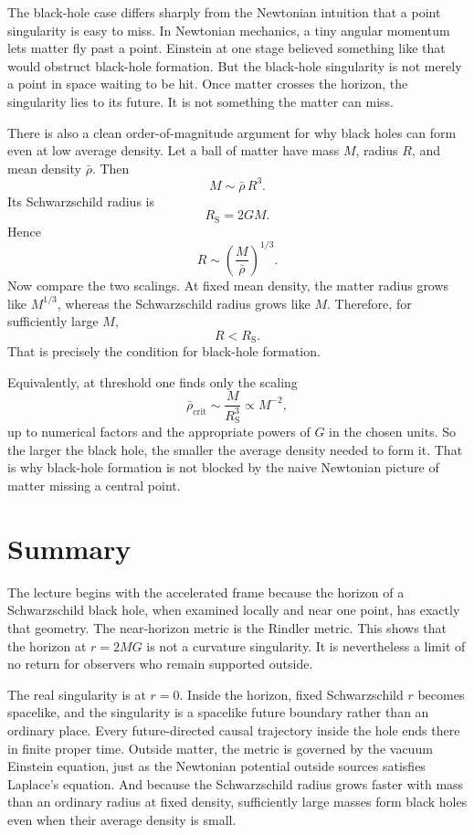 The black-hole case differs sharply from the Newtonian intuition that a point singularity is easy to miss. In Newtonian mechanics, a tiny angular momentum lets matter fly past a point. Einstein at one stage believed something like that would obstruct black-hole formation. But the black-hole singularity is not merely a point in space waiting to be hit. Once matter crosses the horizon, the singularity lies to its future. It is not something the matter can miss.

There is also a clean order-of-magnitude argument for why black holes can form even at low average density. Let a ball of matter have mass \(M\), radius \(R\), and mean density \(\bar\rho\). Then
\begin{equation}
M \sim \bar\rho\,R^3.
\end{equation}
Its Schwarzschild radius is
\begin{equation}
R_{\mathrm S} = 2GM.
\end{equation}
Hence
\begin{equation}
R \sim \left(\frac{M}{\bar\rho}\right)^{1/3}.
\end{equation}
Now compare the two scalings. At fixed mean density, the matter radius grows like \(M^{1/3}\), whereas the Schwarzschild radius grows like \(M\). Therefore, for sufficiently large \(M\),
\begin{equation}
R < R_{\mathrm S}.
\end{equation}
That is precisely the condition for black-hole formation.

Equivalently, at threshold one finds only the scaling
\begin{equation}
\bar\rho_{\mathrm{crit}} \sim \frac{M}{R_{\mathrm S}^3} \propto M^{-2},
\end{equation}
up to numerical factors and the appropriate powers of \(G\) in the chosen units. So the larger the black hole, the smaller the average density needed to form it. That is why black-hole formation is not blocked by the naive Newtonian picture of matter missing a central point.

\section{Summary}

The lecture begins with the accelerated frame because the horizon of a Schwarzschild black hole, when examined locally and near one point, has exactly that geometry. The near-horizon metric is the Rindler metric. This shows that the horizon at \(r=2MG\) is not a curvature singularity. It is nevertheless a limit of no return for observers who remain supported outside.

The real singularity is at \(r=0\). Inside the horizon, fixed Schwarzschild \(r\) becomes spacelike, and the singularity is a spacelike future boundary rather than an ordinary place. Every future-directed causal trajectory inside the hole ends there in finite proper time. Outside matter, the metric is governed by the vacuum Einstein equation, just as the Newtonian potential outside sources satisfies Laplace's equation. And because the Schwarzschild radius grows faster with mass than an ordinary radius at fixed density, sufficiently large masses form black holes even when their average density is small.